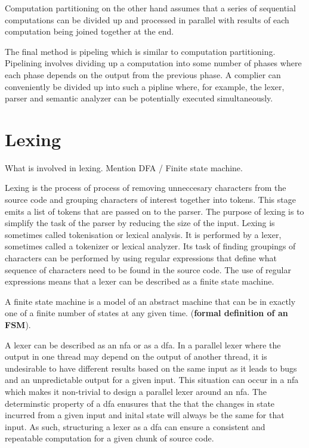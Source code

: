 Computation partitioning on the other hand assumes that a series of sequential
computations can be divided up and processed in parallel with results of
each computation being joined together at the end.

The final method is pipeling which is similar to computation partitioning.
Pipelining involves dividing up a computation into some number of phases
where each phase depends on the output from the previous phase. A complier can
conveniently be divided up into such a pipline where, for example, the lexer,
parser and semantic analyzer can be potentially executed simultaneously. 

\section{Lexing} \label{lit_review_lexing}
\begin{sectionplan}
    What is involved in lexing. Mention DFA / Finite state machine.
	\cite{pai_t_systematic_2020, barve_parallel_2014, barve_parallel_2012, barve_improved_2015}
\end{sectionplan}

Lexing is the process of process of removing unneccesary characters from the
source code and grouping characters of interest together into tokens. This stage
emits a list of tokens that are passed on to the parser. The purpose of lexing
is to simplify the task of the parser by reducing the size of the input. Lexing
is sometimes  called tokenisation or lexical analysis. It is performed by a
lexer, sometimes called a tokenizer or lexical analyzer. Its task of finding
groupings of characters can be performed by using regular expressions that
define what sequence of characters need to be found in the source code. The use
of regular expressions means that a lexer can be described as a finite state
machine.

A finite state machine is a model of an abstract machine that can be in exactly
one of a finite number of states at any given time. (\textbf{formal definition
of an FSM}).

A lexer can be described as an \ac{nfa} or as a \ac{dfa}. In a parallel lexer
where the output in one thread may depend on the output of another thread, it
is undesirable to have different results based on the same input as it leads
to bugs and an unpredictable output for a given input. This situation can occur
in a \ac{nfa} which makes it non-trivial to design a parallel lexer around an
\ac{nfa}. The determinstic property of a \ac{dfa} enusures that the that the
changes in state incurred from a given input and inital state will always be
the same for that input. As such, structuring a lexer as a \ac{dfa} can ensure a
consistent and repeatable computation for a given chunk of source code.



